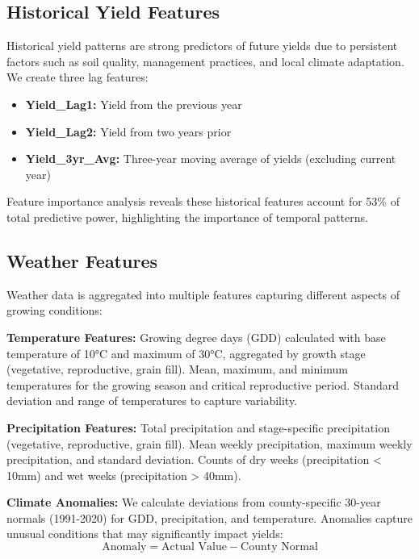 \documentclass[conference]{IEEEtran}
\begin{document}
\subsection{Historical Yield Features}

Historical yield patterns are strong predictors of future yields due to persistent factors such as soil quality, management practices, and local climate adaptation. We create three lag features:
\begin{itemize}
    \item \textbf{Yield\_Lag1:} Yield from the previous year
    \item \textbf{Yield\_Lag2:} Yield from two years prior
    \item \textbf{Yield\_3yr\_Avg:} Three-year moving average of yields (excluding current year)
\end{itemize}

Feature importance analysis reveals these historical features account for 53\% of total predictive power, highlighting the importance of temporal patterns.

\subsection{Weather Features}

Weather data is aggregated into multiple features capturing different aspects of growing conditions:

\textbf{Temperature Features:} Growing degree days (GDD) calculated with base temperature of 10°C and maximum of 30°C, aggregated by growth stage (vegetative, reproductive, grain fill). Mean, maximum, and minimum temperatures for the growing season and critical reproductive period. Standard deviation and range of temperatures to capture variability.

\textbf{Precipitation Features:} Total precipitation and stage-specific precipitation (vegetative, reproductive, grain fill). Mean weekly precipitation, maximum weekly precipitation, and standard deviation. Counts of dry weeks (precipitation < 10mm) and wet weeks (precipitation > 40mm).

\textbf{Climate Anomalies:} We calculate deviations from county-specific 30-year normals (1991-2020) for GDD, precipitation, and temperature. Anomalies capture unusual conditions that may significantly impact yields:
\begin{equation}
\text{Anomaly} = \text{Actual Value} - \text{County Normal}
\end{equation}
\end{document}
